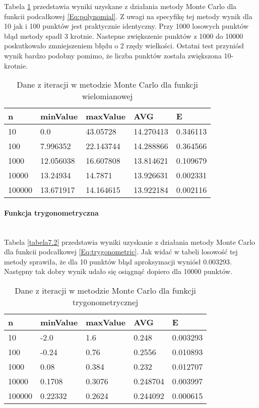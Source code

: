 \documentclass[12pt,twoside]{article}
\begin{document}
Tabela \ref{tabela7.1} przedstawia wyniki uzyskane z działania metody Monte Carlo dla funkcii podcałkowej \eqref{Eq:polynomial}. Z uwagi na specyfikę tej metody wynik dla 10 jak i 100 punktów jest praktycznie identyczny. Przy 1000 losowych punktów błąd metody spadł 3 krotnie. Nastepne zwiększenie punktów z 1000 do 10000 poskutkowało zmniejszeniem błędu o 2 rzędy wielkości. Ostatni test przyniósł wynik bardzo podobny pomimo, że liczba punktów została zwiększona 10- krotnie.

\begin{table}[H]
\centering 
\caption{Dane z iteracji w metodzie Monte Carlo dla funkcji wielomianowej}
\label{tabela7.1}
\begin{tabular}{lllll}
\toprule
n &  minValue &  maxValue &       AVG &      E \\
\midrule
10 & 0.0 &   43.05728 & 14.270413 & 0.346113 \\
100 & 7.996352 &  22.143744 & 14.288866 & 0.364566 \\
1000 & 12.056038 &   16.607808 & 13.814621 & 0.109679 \\
10000 & 13.24934 &  14.7871 & 13.926631 & 0.002331 \\
100000 & 13.671917 &  14.164615 & 13.922184& 0.002116 \\
\bottomrule
\end{tabular}
\end{table}

\paragraph{Funkcja trygonometryczna}\mbox{} \\

Tabela \eqref{tabela7.2} przedstawia wyniki uzyskanie z działania metody Monte Carlo dla funkcii podcałkowej \eqref{Eq:trygonometric}.  Jak widać w tabeli losowość tej metody sprawiła, że dla 10 punktów błąd aproksymacji wyniósł 0.003293. Następny tak dobry wynik udało się osiągnąć dopiero dla 10000 punktów.

\begin{table}[H]
\centering 
\caption{Dane z iteracji w metodzie Monte Carlo dla funkcji trygonometrycznej}
\label{tabela7.2}
\begin{tabular}{lllll}
\toprule
n &  minValue &  maxValue &       AVG &      E \\
\midrule
10 & -2.0 &   1.6 & 0.248 & 0.003293 \\
100 & -0.24 &  0.76 & 0.2556 & 0.010893  \\
1000 & 0.08 &   0.384 & 0.232& 0.012707 \\
10000 & 0.1708 &  0.3076 & 0.248704 & 0.003997 \\
100000 & 0.22332 & 0.2624 & 0.244092 & 0.000615  \\
\bottomrule
\end{tabular}
\end{table}
\end{document}
